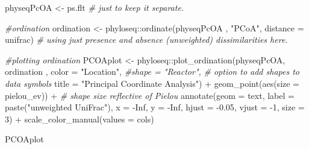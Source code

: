 \documentclass[
]{book}
\newenvironment{Shaded}{\begin{snugshade}}{\end{snugshade}}
\newcommand{\AttributeTok}[1]{\textcolor[rgb]{0.77,0.63,0.00}{#1}}
\newcommand{\CommentTok}[1]{\textcolor[rgb]{0.56,0.35,0.01}{\textit{#1}}}
\newcommand{\ConstantTok}[1]{\textcolor[rgb]{0.00,0.00,0.00}{#1}}
\newcommand{\DecValTok}[1]{\textcolor[rgb]{0.00,0.00,0.81}{#1}}
\newcommand{\FloatTok}[1]{\textcolor[rgb]{0.00,0.00,0.81}{#1}}
\newcommand{\FunctionTok}[1]{\textcolor[rgb]{0.00,0.00,0.00}{#1}}
\newcommand{\NormalTok}[1]{#1}
\newcommand{\OtherTok}[1]{\textcolor[rgb]{0.56,0.35,0.01}{#1}}
\newcommand{\SpecialCharTok}[1]{\textcolor[rgb]{0.00,0.00,0.00}{#1}}
\newcommand{\StringTok}[1]{\textcolor[rgb]{0.31,0.60,0.02}{#1}}
\begin{document}
\begin{Shaded}
\begin{Highlighting}[]
\NormalTok{physeqPcOA }\OtherTok{\textless{}{-}}\NormalTok{  ps.flt  }\CommentTok{\# just to keep it separate.}

\CommentTok{\#ordination}
\NormalTok{ordination }\OtherTok{\textless{}{-}}\NormalTok{ phyloseq}\SpecialCharTok{::}\FunctionTok{ordinate}\NormalTok{(physeqPcOA  , }
                                 \StringTok{"PCoA"}\NormalTok{, }
                                 \AttributeTok{distance =} \StringTok{\textquotesingle{}unifrac\textquotesingle{}}\NormalTok{) }\CommentTok{\# using just presence and absence (unweighted) dissimilarities here. }

\CommentTok{\#plotting ordination}
\NormalTok{PCOAplot }\OtherTok{\textless{}{-}}\NormalTok{ phyloseq}\SpecialCharTok{::}\FunctionTok{plot\_ordination}\NormalTok{(physeqPcOA, }
\NormalTok{                                      ordination , }
                                      \AttributeTok{color =} \StringTok{"Location"}\NormalTok{, }
                                      \CommentTok{\#shape = "Reactor",    }
                                      \CommentTok{\# option to add shapes to data symbols}
                                      \AttributeTok{title =} \StringTok{"Principal Coordinate Analysis"}\NormalTok{) }\SpecialCharTok{+}
     \FunctionTok{geom\_point}\NormalTok{(}\FunctionTok{aes}\NormalTok{(}\AttributeTok{size =}\NormalTok{ pielou\_ev)) }\SpecialCharTok{+}    \CommentTok{\# shape size reflective of Pielou  }
     \FunctionTok{annotate}\NormalTok{(}\AttributeTok{geom =} \StringTok{\textquotesingle{}text\textquotesingle{}}\NormalTok{, }\AttributeTok{label =} \FunctionTok{paste}\NormalTok{(}\StringTok{"unweighted UniFrac"}\NormalTok{), }
             \AttributeTok{x =} \SpecialCharTok{{-}}\ConstantTok{Inf}\NormalTok{, }\AttributeTok{y =} \SpecialCharTok{{-}}\ConstantTok{Inf}\NormalTok{, }\AttributeTok{hjust =} \SpecialCharTok{{-}}\FloatTok{0.05}\NormalTok{, }\AttributeTok{vjust =} \SpecialCharTok{{-}}\DecValTok{1}\NormalTok{, }\AttributeTok{size =} \DecValTok{3}\NormalTok{)  }\SpecialCharTok{+}
     \FunctionTok{scale\_color\_manual}\NormalTok{(}\AttributeTok{values =}\NormalTok{ cols)}

\NormalTok{PCOAplot}
\end{Highlighting}
\end{Shaded}
\end{document}
